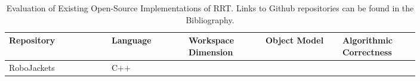 
\begin{table}[H]
\begin{centering}
\begin{tabular}{|p{0.2\linewidth}|p{0.15\linewidth}|p{0.15\linewidth}|p{0.15\linewidth}|p{0.15\linewidth}|}
\hline
Repository  & Language  &  Workspace Dimension  & Object Model & Algorithmic Correctness \\
\hline
RoboJackets\cite{RoboJackets2019}   & \textcolor{mygreen}{C++}    &       &       & \\
\hline
\end{tabular}
\caption[Evaluation of Existing Open-Source Implementations of RRT]{Evaluation of Existing Open-Source Implementations of RRT. Links to Github repositories can be found in the Bibliography.}
\end{centering}
\end{table}
